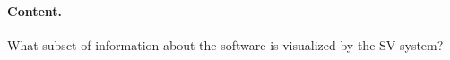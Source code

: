 
\paragraph{Content.} What subset of information about the software is visualized
by the SV system?

